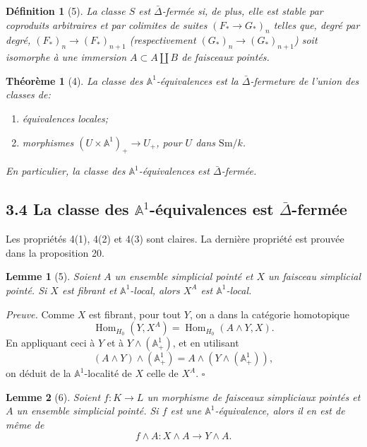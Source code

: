 \documentclass[11pt]{article}
\newcommand{\Aone}{\mathbb A^1}
\newcommand{\Sm}{\mathrm{Sm}}
\newcommand{\Hom}{\operatorname{Hom}}
\theoremstyle{deligne}
\newtheorem*{theorem*}{Théorème}
\newtheorem*{lemma*}{Lemme}
\newtheorem*{definition*}{Définition}
\newenvironment{proofdel}{\noindent\textit{Preuve.}}{\hfill$\square$}
\begin{document}
\begin{definition*}[5]
La classe \(S\) est \(\bar\Delta\)-fermée si, de plus, elle est stable par coproduits arbitraires et par colimites de suites \((F_*\to G_*)_n\) telles que, degré par degré, \((F_*)_n\to(F_*)_{n+1}\) (respectivement \((G_*)_n\to(G_*)_{n+1}\)) soit isomorphe à une immersion \(A\subset A\coprod B\) de faisceaux pointés.
\end{definition*}

\begin{theorem*}[4]
La classe des \(\Aone\)-équivalences est la \(\bar\Delta\)-fermeture de l'union des classes de:
\begin{enumerate}[label=\arabic*.]
\item équivalences locales;
\item morphismes \((U\times\Aone)_+\to U_+\), pour \(U\) dans \(\Sm/k\).
\end{enumerate}
En particulier, la classe des \(\Aone\)-équivalences est \(\bar\Delta\)-fermée.
\end{theorem*}

\subsection*{3.4 La classe des \(\Aone\)-équivalences est \(\bar\Delta\)-fermée}

Les propriétés 4(1), 4(2) et 4(3) sont claires. La dernière propriété est prouvée dans la proposition 20.

\begin{lemma*}[5]
Soient \(A\) un ensemble simplicial pointé et \(X\) un faisceau simplicial pointé. Si \(X\) est fibrant et \(\Aone\)-local, alors \(X^A\) est \(\Aone\)-local.
\end{lemma*}

\begin{proofdel}
Comme \(X\) est fibrant, pour tout \(Y\), on a dans la catégorie homotopique
\[
\Hom_{H_0}(Y,X^A)=\Hom_{H_0}(A\wedge Y,X). \tag{17.1}
\]
En appliquant ceci à \(Y\) et à \(Y\wedge(\Aone_+)\), et en utilisant
\[
(A\wedge Y)\wedge(\Aone_+)=A\wedge(Y\wedge(\Aone_+)),
\]
on déduit de la \(\Aone\)-localité de \(X\) celle de \(X^A\).
\end{proofdel}

\begin{lemma*}[6]
Soient \(f:K\to L\) un morphisme de faisceaux simpliciaux pointés et \(A\) un ensemble simplicial pointé. Si \(f\) est une \(\Aone\)-équivalence, alors il en est de même de
\[
f\wedge A:X\wedge A\longrightarrow Y\wedge A.
\]
\end{lemma*}
\end{document}
